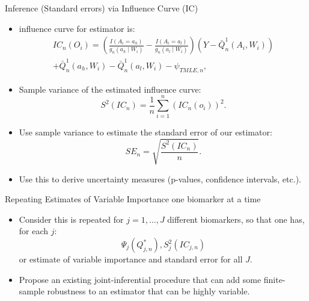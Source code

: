 \documentclass[12pt,t]{beamer}
\begin{document}
\begin{frame}[c]{Inference (Standard errors) via Influence Curve (IC)}

\begin{center}
\begin{itemize}
\item influence curve for estimator is:
\begin{multline*}
IC_n(O_i)=\left (\frac{I(A_i=a_h)}{g_n(a_h\mid W_i)}-\frac{I(A_i=a_l)}{g_n(a_l\mid W_i)}\right)(Y-\bar{Q}^1_n(A_i,W_i))\\
+\bar{Q}^1_n(a_h,W_i)-\bar{Q}^1_n(a_l,W_i)-\psi_{TMLE,n},
\end{multline*}
\item Sample variance of the estimated influence curve:
\[\textstyle S^2(IC_n)=\frac{1}{n}\sum_{i=1}^n\left(IC_n(o_i)\right)^2.\]
\item Use sample variance to estimate the standard error of our estimator:
\[SE_n=\sqrt{\frac{S^2(IC_n)}{n}}.\]
\item Use this to derive uncertainty measures (p-values, confidence intervals, etc.).
\end{itemize}
\end{center}


\end{frame}



\begin{frame}[c]{Repeating Estimates of Variable Importance one biomarker at a
  time}

\Large{
\begin{itemize}
\item Consider this is repeated for $j=1,\ldots,J$  different biomarkers, so that one has, for each $j$: 
$$\Psi_j(Q_{j,n}^{*}),S_j^2(IC_{j,n})$$
or estimate of variable importance and standard error for all $J$.
\item Propose an existing joint-inferential procedure that can add some finite-sample robustness to an estimator that can be highly variable.
\end{itemize}
}


\end{frame}
\end{document}
